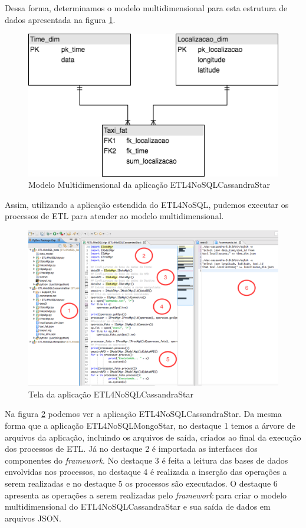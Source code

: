 Dessa forma, determinamos o modelo multidimensional para esta estrutura de dados apresentada na figura \ref{cassandramultidim}.

\begin{figure}[h!]
	\centering
	\includegraphics[scale=0.5]{fig/cassandra_multidim.png}
	\caption{Modelo Multidimensional da aplicação ETL4NoSQLCassandraStar}
	\label{cassandramultidim}
\end{figure}

Assim, utilizando a aplicação estendida do ETL4NoSQL, pudemos executar os processos de ETL para atender ao modelo multidimensional.

\begin{figure}[h!]
	\centering
	\includegraphics[scale=0.4]{fig/ETL4NoSQLCassandraStar.png}
	\caption{Tela da aplicação ETL4NoSQLCassandraStar}
	\label{ETL4NoSQLCassandraStar}
\end{figure}

Na figura \ref{ETL4NoSQLCassandraStar} podemos ver a aplicação ETL4NoSQLCassandraStar. Da mesma forma que a aplicação ETL4NoSQLMongoStar, no destaque 1 temos a árvore de arquivos da aplicação, incluindo os arquivos de saída, criados ao final da execução dos processos de ETL. Já no destaque 2 é importada as interfaces dos componentes do \textit{framework}. No destaque 3 é feita a leitura das bases de dados envolvidas nos processos, no destaque 4 é realizada a inserção das operações a serem realizadas e no destaque 5 os processos são executados. O destaque 6 apresenta as operações a serem realizadas pelo \textit{framework} para criar o modelo multidimensional do ETL4NoSQLCassandraStar e sua saída de dados em arquivos JSON.

